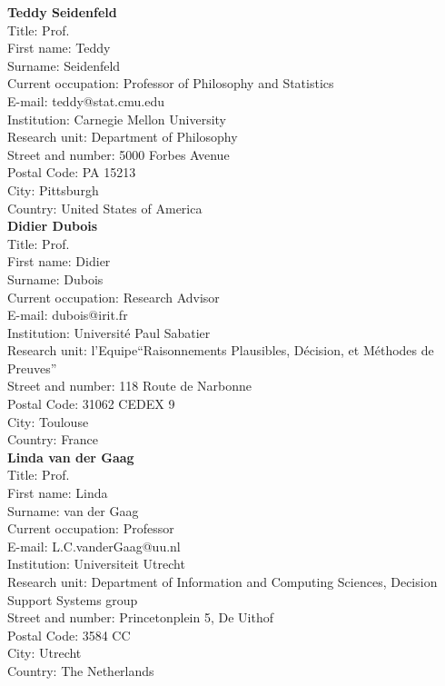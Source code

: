 \documentclass[11pt,dvipsnames,usenames,a4paper]{article}
\begin{document}
{\bf Teddy Seidenfeld}\\
Title: Prof.\\
First name: Teddy\\
Surname: Seidenfeld \\
Current occupation: Professor of Philosophy and Statistics\\
E-mail: teddy@stat.cmu.edu\\
Institution: Carnegie Mellon University\\
Research unit: Department of Philosophy\\
Street and number: 5000 Forbes Avenue\\
Postal Code: PA 15213\\
City:  Pittsburgh\\
Country: United States of America\\[-7pt]

{\bf Didier Dubois}\\
Title: Prof.\\
First name: Didier\\
Surname:  Dubois \\
Current occupation: Research Advisor\\
E-mail: dubois@irit.fr\\
Institution: Universit\'e Paul Sabatier\\
Research unit: l'Equipe``Raisonnements Plausibles, Décision, et Méthodes de Preuves''\\
Street and number: 118 Route de Narbonne\\
Postal Code: 31062 CEDEX 9\\
City: Toulouse\\
Country: France\\[-7pt]

{\bf Linda van der Gaag}\\
Title: Prof.\\
First name: Linda\\
Surname:  van der Gaag\\
Current occupation: Professor\\
E-mail: L.C.vanderGaag@uu.nl\\
Institution: Universiteit Utrecht\\
Research unit: Department of Information and Computing Sciences, Decision Support Systems group\\
Street and number: Princetonplein 5, De Uithof\\
Postal Code: 3584 CC\\
City: Utrecht\\
Country: The Netherlands\\[-7pt]
\end{document}
